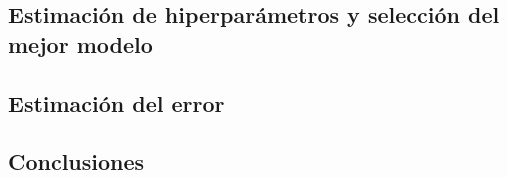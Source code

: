 \documentclass[a4paper, 20pt]{article}
\begin{document}
\subsection{Estimación de hiperparámetros y selección del mejor modelo}

\subsection{Estimación del error}

\subsection{Conclusiones}
\newpage

\printbibliography
\end{document}
